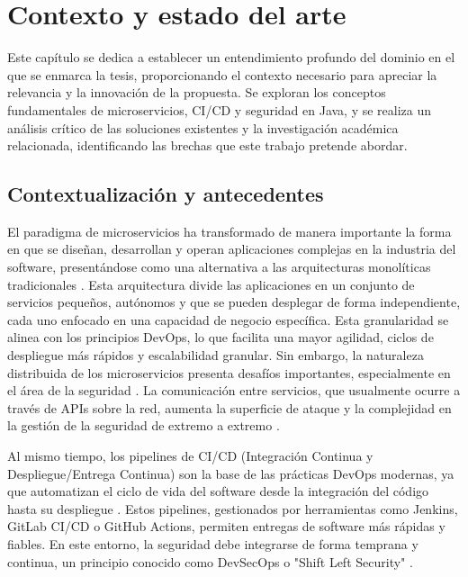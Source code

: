 \chapter{Contexto y estado del arte}\label{chap:contexto_estado_arte}
Este capítulo se dedica a establecer un entendimiento profundo del dominio en el que se enmarca la tesis, proporcionando el contexto necesario para apreciar la relevancia y la innovación de la propuesta. Se exploran los conceptos fundamentales de microservicios, CI/CD y seguridad en Java, y se realiza un análisis crítico de las soluciones existentes y la investigación académica relacionada, identificando las brechas que este trabajo pretende abordar.

\section{Contextualización y antecedentes}\label{sec:contextyantec}
El paradigma de microservicios ha transformado de manera importante la forma en que se diseñan, desarrollan y operan aplicaciones complejas en la industria del software, presentándose como una alternativa a las arquitecturas monolíticas tradicionales \cite{Zafeiropoulos2023SecurityGaps}. Esta arquitectura divide las aplicaciones en un conjunto de servicios pequeños, autónomos y que se pueden desplegar de forma independiente, cada uno enfocado en una capacidad de negocio específica. Esta granularidad se alinea con los principios DevOps, lo que facilita una mayor agilidad, ciclos de despliegue más rápidos y escalabilidad granular. Sin embargo, la naturaleza distribuida de los microservicios presenta desafíos importantes, especialmente en el área de la seguridad \cite{Zafeiropoulos2023SecurityGaps, AlDhuraibi2022SecurityIssues}. La comunicación entre servicios, que usualmente ocurre a través de APIs sobre la red, aumenta la superficie de ataque y la complejidad en la gestión de la seguridad de extremo a extremo \cite{AlDhuraibi2022SecurityIssues}.

Al mismo tiempo, los pipelines de CI/CD (Integración Continua y Despliegue/Entrega Continua) son la base de las prácticas DevOps modernas, ya que automatizan el ciclo de vida del software desde la integración del código hasta su despliegue \cite{Santos2023DevSecOpsReview}. Estos pipelines, gestionados por herramientas como Jenkins, GitLab CI/CD o GitHub Actions, permiten entregas de software más rápidas y fiables. En este entorno, la seguridad debe integrarse de forma temprana y continua, un principio conocido como DevSecOps o "Shift Left Security" \cite{Santos2023DevSecOpsReview, Kumar2022DevSecOpsReview}.

